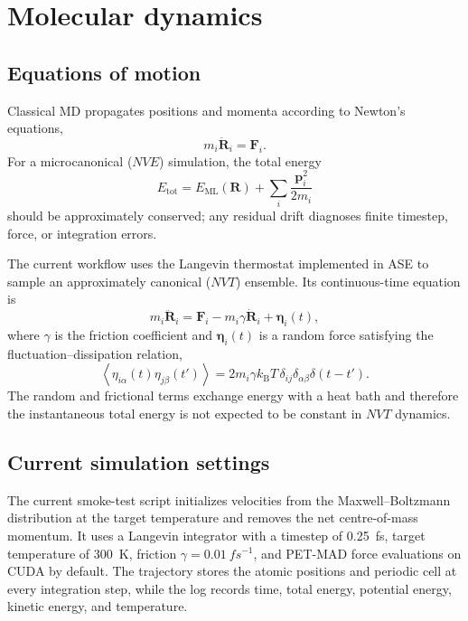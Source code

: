 \documentclass[11pt,a4paper]{article}
\begin{document}
\section{Molecular dynamics}

\subsection{Equations of motion}

Classical MD propagates positions and momenta according to Newton's equations,
\begin{equation}
  m_i \ddot{\bm{R}}_i = \bm{F}_i.
\end{equation}
For a microcanonical ($NVE$) simulation, the total energy
\begin{equation}
  E_{\mathrm{tot}} = E_{\mathrm{ML}}(\bm{R}) + \sum_i \frac{\bm{p}_i^2}{2m_i}
\end{equation}
should be approximately conserved; any residual drift diagnoses finite timestep, force, or integration errors.

The current workflow uses the Langevin thermostat implemented in ASE to sample an approximately canonical ($NVT$) ensemble. Its continuous-time equation is
\begin{equation}
  m_i \ddot{\bm{R}}_i = \bm{F}_i - m_i\gamma \dot{\bm{R}}_i + \bm{\eta}_i(t),
  \label{eq:langevin}
\end{equation}
where $\gamma$ is the friction coefficient and $\bm{\eta}_i(t)$ is a random force satisfying the fluctuation--dissipation relation,
\begin{equation}
  \left\langle \eta_{i\alpha}(t)\eta_{j\beta}(t') \right\rangle
  = 2m_i\gamma k_{\mathrm{B}}T\,\delta_{ij}\delta_{\alpha\beta}\delta(t-t').
\end{equation}
The random and frictional terms exchange energy with a heat bath and therefore the instantaneous total energy is not expected to be constant in $NVT$ dynamics.

\subsection{Current simulation settings}

The current smoke-test script initializes velocities from the Maxwell--Boltzmann distribution at the target temperature and removes the net centre-of-mass momentum. It uses a Langevin integrator with a timestep of \SI{0.25}{fs}, target temperature of \SI{300}{K}, friction $\gamma=\SI{0.01}{fs^{-1}}$, and PET-MAD force evaluations on CUDA by default. The trajectory stores the atomic positions and periodic cell at every integration step, while the log records time, total energy, potential energy, kinetic energy, and temperature.
\end{document}
